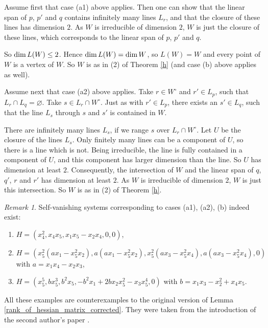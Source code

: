 \documentclass[12pt]{article}
\theoremstyle{definition}
\theoremstyle{remark}
\newtheorem{remark}[theorem]{Remark}
\def\dim{{\rm dim}}
\begin{document}
Assume first that case (a1) above applies. 
Then one can show that the linear span of $p$, $p'$ and $q$ contains
infinitely many lines $L_r$, and that the closure of these lines has dimension $2$.
As $W$ is irreducible of dimension $2$, $W$ is just the closure of these lines, 
which corresponds to the linear span of $p$, $p'$ and $q$. 

So $\dim\, L(W) \le 2$. Hence $\dim\, L(W) = \dim\, W$, so $L(W) = W$ and every
point of $W$ is a vertex of $W$. So $W$ is as in (2) of Theorem \ref{h}
(and case (b) above applies as well). 

Assume next that case (a2) above applies. Take $r \in W^{\circ}$ and $r' \in L_p$, 
such that $L_r \cap L_q = \varnothing$. Take $s \in L_r \cap W^{\circ}$. 
Just as with $r' \in L_p$, there exists an $s' \in L_q$, such that the line
$L_s$ through $s$ and $s'$ is contained in $W$. 

There are infinitely many lines $L_s$, if we range 
$s$ over $L_r \cap W^{\circ}$. Let $U$ be the closure of the lines $L_s$.
Only finitely many lines can be a component of $U$, so there is a line which is not. 
Being irreducible, the line is fully contained in a component of $U$, and this 
component has larger dimension than the line. So $U$ has dimension at least $2$.
Consequently, the intersection of $W$ and the linear span
of $q$, $q'$, $r$ and $r'$ has dimension at least $2$. As $W$ is irreducible
of dimension $2$, $W$ is just this intersection. So $W$ is as in (2) of
Theorem \ref{h}.

\begin{remark}
Self-vanishing systems corresponding to cases (a1), (a2), (b) indeed exist:
\begin{enumerate}

\item[(a1)] $H = (x_4^2,x_4x_5,x_1x_5-x_2x_4,0,0)$,

\item[(a2)] $H = (x_5^2(ax_1-x_5^2x_2),a(ax_1-x_5^2x_2),x_5^2(ax_3-x_5^2x_4),
            a(ax_3-x_5^2x_4),0)$ with $a = x_1x_4-x_2x_3$,

\item[(b)]  $H = (x_5^5,bx_5^3,b^2x_5,-b^2x_1+2bx_2x_5^2-x_3x_5^4,0)$ with 
            $b = x_1x_3-x_2^2+x_4x_5$.

\end{enumerate}
All these examples are counterexamples to the original version of Lemma 
\ref{rank_of_hessian_matrix_corrected}. They were taken from the introduction 
of the second author's paper \cite{hmgqt5}. 
%
\end{remark}
\end{document}
